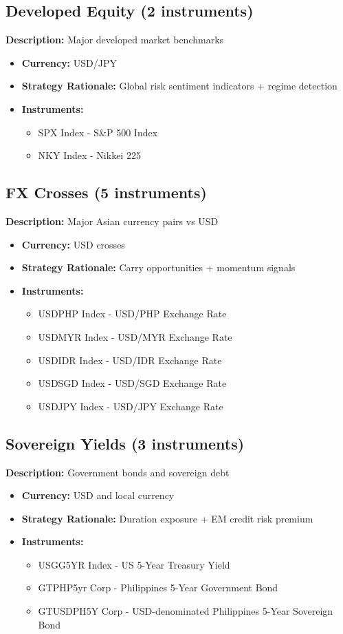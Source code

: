 \documentclass{article}
\begin{document}
\subsection{Developed Equity (2 instruments)}
\textbf{Description:} Major developed market benchmarks\\
\begin{itemize}
\item \textbf{Currency:} USD/JPY
\item \textbf{Strategy Rationale:} Global risk sentiment indicators + regime detection
\item \textbf{Instruments:}
  \begin{itemize}
    \item SPX Index - S\&P 500 Index
    \item NKY Index - Nikkei 225
  \end{itemize}
\end{itemize}

\subsection{FX Crosses (5 instruments)}
\textbf{Description:} Major Asian currency pairs vs USD\\
\begin{itemize}
\item \textbf{Currency:} USD crosses
\item \textbf{Strategy Rationale:} Carry opportunities + momentum signals
\item \textbf{Instruments:}
  \begin{itemize}
    \item USDPHP Index - USD/PHP Exchange Rate
    \item USDMYR Index - USD/MYR Exchange Rate
    \item USDIDR Index - USD/IDR Exchange Rate
    \item USDSGD Index - USD/SGD Exchange Rate
    \item USDJPY Index - USD/JPY Exchange Rate
  \end{itemize}
\end{itemize}

\subsection{Sovereign Yields (3 instruments)}
\textbf{Description:} Government bonds and sovereign debt\\
\begin{itemize}
\item \textbf{Currency:} USD and local currency
\item \textbf{Strategy Rationale:} Duration exposure + EM credit risk premium
\item \textbf{Instruments:}
  \begin{itemize}
    \item USGG5YR Index - US 5-Year Treasury Yield
    \item GTPHP5yr Corp - Philippines 5-Year Government Bond
    \item GTUSDPH5Y Corp - USD-denominated Philippines 5-Year Sovereign Bond
  \end{itemize}
\end{itemize}
\end{document}
